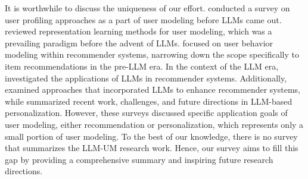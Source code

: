 \documentclass[11pt]{article}
\begin{document}

It is worthwhile to discuss the uniqueness of our effort.  \citet{farid2018user} conducted a survey on user profiling approaches as a part of user modeling before LLMs came out. \citet{li2021survey} reviewed representation learning methods for user modeling, which was a prevailing paradigm before the advent of LLMs. \citet{he2023survey} focused on user behavior modeling within recommender systems, narrowing down the scope specifically to item recommendations in the pre-LLM era.
In the context of the LLM era, \citet{fan2023recommender, wu2023survey} investigated the applications of LLMs in recommender systems. Additionally, \citet{lin2023can} examined approaches that incorporated LLMs to enhance recommender systems, while \citet{chen2023large} summarized recent work, challenges, and future directions in LLM-based personalization. However, these surveys discussed specific application goals of user modeling, either recommendation or personalization, which represents only a small portion of user modeling. To the best of our knowledge, there is no survey that summarizes the LLM-UM research work. Hence, our survey aims to fill this gap by providing a comprehensive summary and inspiring future research directions.
\end{document}
